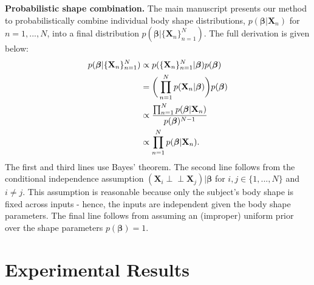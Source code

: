 \documentclass[final]{cvpr}
\newcommand{\indep}{\perp \!\!\! \perp}
\begin{document}
\noindent \textbf{Probabilistic shape combination.} The main manuscript presents our method to probabilistically combine individual body shape distributions, $p(\boldsymbol{\beta} | \mathbf{X}_n)$ for $n = 1, ..., N$, into a final distribution $p(\boldsymbol{\beta} | \{\mathbf{X}_n\}_{n=1}^N)$. The full derivation is given below:
\begin{equation}
\begin{aligned}
p(\boldsymbol{\beta} | \{\mathbf{X}_n\}_{n=1}^N) 
& \propto p(\{\mathbf{X}_n\}_{n=1}^N | \boldsymbol{\beta})p(\boldsymbol{\beta})\\
& = \bigg(\prod_{n=1}^N p(\mathbf{X}_n | \boldsymbol{\beta}) \bigg)p(\boldsymbol{\beta})\\
& \propto \frac{\prod_{n=1}^N p(\boldsymbol{\beta} | \mathbf{X}_n)}{p(\boldsymbol{\beta})^{N-1}}\\
& \propto \prod_{n=1}^N p(\boldsymbol{\beta} | \mathbf{X}_n).
\end{aligned}
\label{eqn:probabilistic_shape_combination}
\vspace{-0.1cm}
\end{equation}
The first and third lines use Bayes' theorem. The second line follows from the conditional independence assumption $(\mathbf{X}_i \indep \mathbf{X}_j) | \boldsymbol{\beta}$ for $i,j \in \{1,...,N\}$ and $i \neq j$. This assumption is reasonable because only the subject's body shape is fixed across inputs - hence, the inputs are independent given the body shape parameters. The final line follows from assuming an (improper) uniform prior over the shape parameters $p(\boldsymbol{\beta}) = 1$.


\section{Experimental Results}
\label{sec:supmat_experiment_results}
\end{document}

